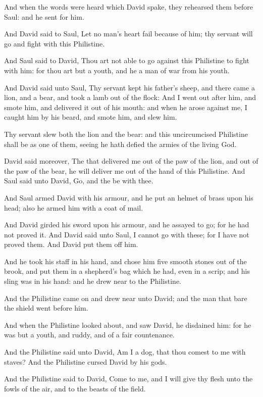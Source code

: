 \verse And when the words were heard which David spake, they rehearsed them before Saul: and he sent for him.

\verse And David said to Saul, Let no man's heart fail because of him; thy servant will go and fight with this Philistine.

\verse And Saul said to David, Thou art not able to go against this Philistine to fight with him: for thou art but a youth, and he a man of war from his youth.

\verse And David said unto Saul, Thy servant kept his father's sheep, and there came a lion, and a bear, and took a lamb out of the flock: \verse And I went out after him, and smote him, and delivered it out of his mouth: and when he arose against me, I caught him by his beard, and smote him, and slew him.

\verse Thy servant slew both the lion and the bear: and this uncircumcised Philistine shall be as one of them, seeing he hath defied the armies of the living God.

\verse David said moreover, The \LORD that delivered me out of the paw of the lion, and out of the paw of the bear, he will deliver me out of the hand of this Philistine. And Saul said unto David, Go, and the \LORD be with thee.

\verse And Saul armed David with his armour, and he put an helmet of brass upon his head; also he armed him with a coat of mail.

\verse And David girded his sword upon his armour, and he assayed to go; for he had not proved it. And David said unto Saul, I cannot go with these; for I have not proved them. And David put them off him.

\verse And he took his staff in his hand, and chose him five smooth stones out of the brook, and put them in a shepherd's bag which he had, even in a scrip; and his sling was in his hand: and he drew near to the Philistine.

\verse And the Philistine came on and drew near unto David; and the man that bare the shield went before him.

\verse And when the Philistine looked about, and saw David, he disdained him: for he was but a youth, and ruddy, and of a fair countenance.

\verse And the Philistine said unto David, Am I a dog, that thou comest to me with staves? And the Philistine cursed David by his gods.

\verse And the Philistine said to David, Come to me, and I will give thy flesh unto the fowls of the air, and to the beasts of the field.

